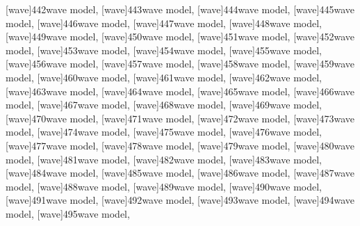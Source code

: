 \documentclass[a4paper,11pt]{article}
\begin{document}
[wave]{442}{wave model},
[wave]{443}{wave model},
[wave]{444}{wave model},
[wave]{445}{wave model},
[wave]{446}{wave model},
[wave]{447}{wave model},
[wave]{448}{wave model}, \\[0.7em]
[wave]{449}{wave model},
[wave]{450}{wave model},
[wave]{451}{wave model},
[wave]{452}{wave model},
[wave]{453}{wave model},
[wave]{454}{wave model},
[wave]{455}{wave model}, \\[0.7em]
[wave]{456}{wave model},
[wave]{457}{wave model},
[wave]{458}{wave model},
[wave]{459}{wave model},
[wave]{460}{wave model},
[wave]{461}{wave model},
[wave]{462}{wave model}, \\[0.7em]
[wave]{463}{wave model},
[wave]{464}{wave model},
[wave]{465}{wave model},
[wave]{466}{wave model},
[wave]{467}{wave model},
[wave]{468}{wave model},
[wave]{469}{wave model}, \\[0.7em]
[wave]{470}{wave model},
[wave]{471}{wave model},
[wave]{472}{wave model},
[wave]{473}{wave model},
[wave]{474}{wave model},
[wave]{475}{wave model},
[wave]{476}{wave model}, \\[0.7em]
[wave]{477}{wave model},
[wave]{478}{wave model},
[wave]{479}{wave model},
[wave]{480}{wave model},
[wave]{481}{wave model},
[wave]{482}{wave model},
[wave]{483}{wave model}, \\[0.7em]
[wave]{484}{wave model},
[wave]{485}{wave model},
[wave]{486}{wave model},
[wave]{487}{wave model},
[wave]{488}{wave model},
[wave]{489}{wave model},
[wave]{490}{wave model}, \\[0.7em]
[wave]{491}{wave model},
[wave]{492}{wave model},
[wave]{493}{wave model},
[wave]{494}{wave model},
[wave]{495}{wave model},
\end{document}
